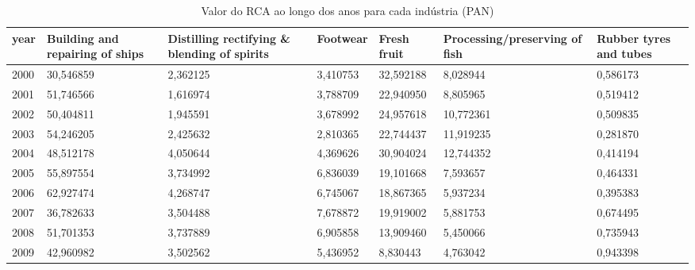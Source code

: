 \begin{table}
\centering
\caption{Valor do RCA ao longo dos anos para cada indústria (PAN)}
\begin{tabular}{p{1cm}p{2cm}p{2cm}p{2cm}p{2cm}p{2cm}p{2cm}}
\toprule
 year &  Building and repairing of ships &  Distilling rectifying \& blending of spirits &  Footwear &  Fresh fruit &  Processing/preserving of fish &  Rubber tyres and tubes \\
\midrule
 2000 &                        30,546859 &                                     2,362125 &  3,410753 &    32,592188 &                       8,028944 &                0,586173 \\
 2001 &                        51,746566 &                                     1,616974 &  3,788709 &    22,940950 &                       8,805965 &                0,519412 \\
 2002 &                        50,404811 &                                     1,945591 &  3,678992 &    24,957618 &                      10,772361 &                0,509835 \\
 2003 &                        54,246205 &                                     2,425632 &  2,810365 &    22,744437 &                      11,919235 &                0,281870 \\
 2004 &                        48,512178 &                                     4,050644 &  4,369626 &    30,904024 &                      12,744352 &                0,414194 \\
 2005 &                        55,897554 &                                     3,734992 &  6,836039 &    19,101668 &                       7,593657 &                0,464331 \\
 2006 &                        62,927474 &                                     4,268747 &  6,745067 &    18,867365 &                       5,937234 &                0,395383 \\
 2007 &                        36,782633 &                                     3,504488 &  7,678872 &    19,919002 &                       5,881753 &                0,674495 \\
 2008 &                        51,701353 &                                     3,737889 &  6,905858 &    13,909460 &                       5,450066 &                0,735943 \\
 2009 &                        42,960982 &                                     3,502562 &  5,436952 &     8,830443 &                       4,763042 &                0,943398 \\

\end{tabular}
\end{table}
